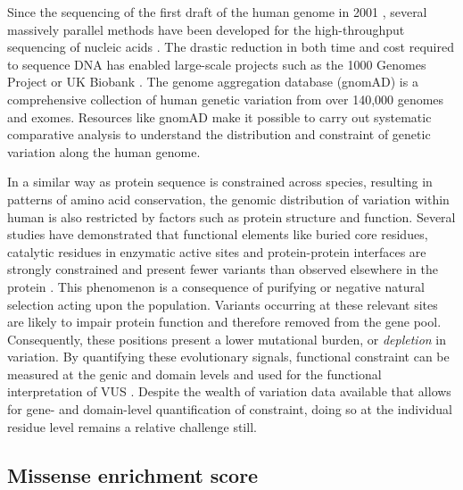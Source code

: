 Since the sequencing of the first draft of the human genome in 2001 \cite{CONSORTIUM_2001_GENOME}, several massively parallel methods have been developed for the high-throughput sequencing of nucleic acids \cite{KASIANOWICZ_1996_NANOPORE, MARGULIES_2005_PYROSEQUENCING, BENTLEY_2008_ILLUMINA, EID_2009_PACBIO, ROTHBERG_2011_IONTORRENT}. The drastic reduction in both time and cost required to sequence DNA has enabled large-scale projects such as the 1000 Genomes Project \cite{AUTON_2015_1000KG} or UK Biobank \cite{BYCROFT_2018_UKBIOBANK}. The genome aggregation database (gnomAD) is a comprehensive collection of human genetic variation from over 140,000 genomes and exomes. Resources like gnomAD make it possible to carry out systematic comparative analysis to understand the distribution and constraint of genetic variation along the human genome.

In a similar way as protein sequence is constrained across species, resulting in patterns of amino acid conservation, the genomic distribution of variation within human is also restricted by factors such as protein structure and function. Several studies have demonstrated that functional elements like buried core residues, catalytic residues in enzymatic active sites and protein-protein interfaces are strongly constrained and present fewer variants than observed elsewhere in the protein \cite{GONG_2010_CONSTRAINT, BEER_2013_CONSTRAINT, DAVID_2015_CONSTRAINT, SIVLEY_2018_CONSTRAINT}. This phenomenon is a consequence of purifying or negative natural selection acting upon the population. Variants occurring at these relevant sites are likely to impair protein function and therefore removed from the gene pool. Consequently, these positions present a lower mutational burden, or \textit{depletion} in variation. By quantifying these evolutionary signals, functional constraint can be measured at the genic \cite{PETROVSKI_2013_CONSTRAINT} and domain \cite{GUSSOW_2016_CONSTRAINT} levels and used for the functional interpretation of VUS \cite{LI_2022_CONSTRAINT}. Despite the wealth of variation data available that allows for gene- and domain-level quantification of constraint, doing so at the individual residue level remains a relative challenge still.

\subsection{Missense enrichment score}

